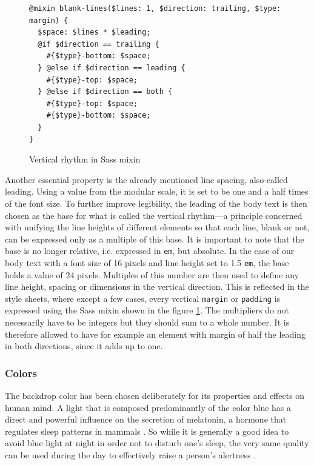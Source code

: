 \documentclass[thesis=M,english,hidelinks]{FITthesis}[2012/10/20]
\newcommand{\code}{\texttt}
\begin{document}
\begin{figure}[h]
  \begin{lstlisting}
@mixin blank-lines($lines: 1, $direction: trailing, $type: margin) {
  $space: $lines * $leading;
  @if $direction == trailing {
    #{$type}-bottom: $space;
  } @else if $direction == leading {
    #{$type}-top: $space;
  } @else if $direction == both {
    #{$type}-top: $space;
    #{$type}-bottom: $space;
  }
}
  \end{lstlisting}
  \caption{Vertical rhythm in Sass mixin}
  \label{fig:vertical_rhythm_mixin}
\end{figure}

Another essential property is the already mentioned line spacing, also-called leading. Using a value from the modular scale, it is set to be one and a half times of the font size. To further improve legibility, the leading of the body text is then chosen as the base for what is called the vertical rhythm---a principle concerned with unifying the line heights of different elements so that each line, blank or not, can be expressed only as a multiple of this base. It is important to note that the base is no longer relative, i.e. expressed in \code{em}, but absolute. In the case of our body text with a font size of 16 pixels and line height set to 1.5 \code{em}, the base holds a value of 24 pixels. Multiples of this number are then used to define any line height, spacing or dimensions in the vertical direction. This is reflected in the style sheets, where except a few cases, every vertical \code{margin} or \code{padding} is expressed using the Sass mixin shown in the figure \ref{fig:vertical_rhythm_mixin}. The multipliers do not necessarily have to be integers but they should sum to a whole number. It is therefore allowed to have for example an element with margin of half the leading in both directions, since it adds up to one.

    \subsubsection{Colors}

The backdrop color has been chosen deliberately for its properties and effects on human mind. A light that is composed predominantly of the color blue has a direct and powerful influence on the secretion of melatonin, a hormone that regulates sleep patterns in mammals \cite{revell}. So while it is generally a good idea to avoid blue light at night in order not to disturb one's sleep, the very same quality can be used during the day to effectively raise a person's alertness \cite{viola}.
\end{document}

